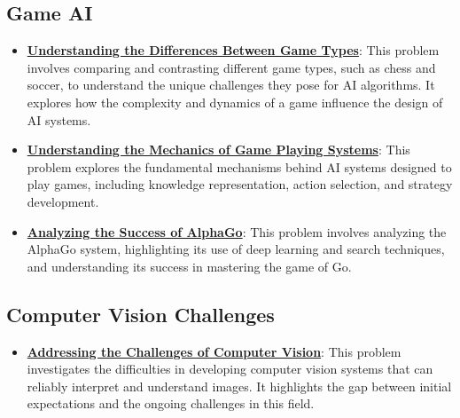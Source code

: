 \documentclass{article}%
\begin{document}
\subsection{Game AI}%
\label{subsec:GameAI}%
\begin{itemize}[leftmargin=*]%
\item \href{https://purdue.brightspace.com/d2l/common/assets/pdfjs-d2l-dist/1.0.14-legacy/web/viewer.html?file=\%2Fcontent\%2Fenforced\%2F1095467-wl.202510.CS.24300.001\%2F02L2-Intro.pdf\%3Fou\%3D1095467\&lang=en-us\&container=d2l-fileviewer-rendered-pdf\&fullscreen=d2l-fileviewer-rendered-pdf-dialog\&height=667#page=27}{\textbf{Understanding the Differences Between Game Types}}: This problem involves comparing and contrasting different game types, such as chess and soccer, to understand the unique challenges they pose for AI algorithms. It explores how the complexity and dynamics of a game influence the design of AI systems.%
\item \href{https://purdue.brightspace.com/d2l/common/assets/pdfjs-d2l-dist/1.0.14-legacy/web/viewer.html?file=\%2Fcontent\%2Fenforced\%2F1095467-wl.202510.CS.24300.001\%2F02L2-Intro.pdf\%3Fou\%3D1095467\&lang=en-us\&container=d2l-fileviewer-rendered-pdf\&fullscreen=d2l-fileviewer-rendered-pdf-dialog\&height=667#page=47}{\textbf{Understanding the Mechanics of Game Playing Systems}}: This problem explores the fundamental mechanisms behind AI systems designed to play games, including knowledge representation, action selection, and strategy development.%
\item \href{https://purdue.brightspace.com/d2l/common/assets/pdfjs-d2l-dist/1.0.14-legacy/web/viewer.html?file=\%2Fcontent\%2Fenforced\%2F1095467-wl.202510.CS.24300.001\%2F02L2-Intro.pdf\%3Fou\%3D1095467\&lang=en-us\&container=d2l-fileviewer-rendered-pdf\&fullscreen=d2l-fileviewer-rendered-pdf-dialog\&height=667#page=50}{\textbf{Analyzing the Success of AlphaGo}}: This problem involves analyzing the AlphaGo system, highlighting its use of deep learning and search techniques, and understanding its success in mastering the game of Go.%
\end{itemize}

%
\subsection{Computer Vision Challenges}%
\label{subsec:ComputerVisionChallenges}%
\begin{itemize}[leftmargin=*]%
\item \href{https://purdue.brightspace.com/d2l/common/assets/pdfjs-d2l-dist/1.0.14-legacy/web/viewer.html?file=\%2Fcontent\%2Fenforced\%2F1095467-wl.202510.CS.24300.001\%2F02L2-Intro.pdf\%3Fou\%3D1095467\&lang=en-us\&container=d2l-fileviewer-rendered-pdf\&fullscreen=d2l-fileviewer-rendered-pdf-dialog\&height=667#page=15}{\textbf{Addressing the Challenges of Computer Vision}}: This problem investigates the difficulties in developing computer vision systems that can reliably interpret and understand images. It highlights the gap between initial expectations and the ongoing challenges in this field.%
\end{itemize}
\end{document}
